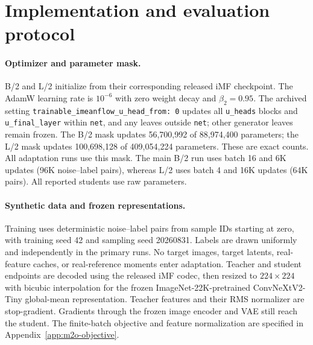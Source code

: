 \section{Implementation and evaluation protocol}
\label{app:protocol}

\paragraph{Optimizer and parameter mask.}
B/2 and L/2 initialize from their corresponding released iMF checkpoint. The
AdamW learning rate is $10^{-6}$ with zero weight decay and $\beta_2=0.95$.
The archived setting \texttt{trainable\_imeanflow\_u\_head\_from: 0}
updates all \texttt{u\_heads} blocks and \texttt{u\_final\_layer} within
\texttt{net}, and any leaves outside \texttt{net}; other generator leaves
remain frozen. The B/2 mask updates 56,700,992 of 88,974,400 parameters;
the L/2 mask updates 100,698,128 of 409,054,224 parameters. These are exact
counts. All adaptation runs use this mask. The main B/2 run uses batch 16
and 6K updates (96K noise--label pairs), whereas L/2 uses batch 4 and 16K
updates (64K pairs). All reported students use raw parameters.

\paragraph{Synthetic data and frozen representations.}
Training uses deterministic noise--label pairs from sample IDs starting at
zero, with training seed 42 and sampling seed 20260831. Labels are drawn
uniformly and independently in the primary runs. No target images, target
latents, real-feature caches, or real-reference moments enter adaptation.
Teacher and student endpoints are decoded using the released iMF codec,
then resized to $224\times224$ with bicubic interpolation for the frozen
ImageNet-22K-pretrained ConvNeXtV2-Tiny global-mean representation.
Teacher features and their RMS normalizer are stop-gradient. Gradients
through the frozen image encoder and VAE still reach the student.
The finite-batch objective and feature normalization are specified in
Appendix~\ref{app:m2o-objective}.

